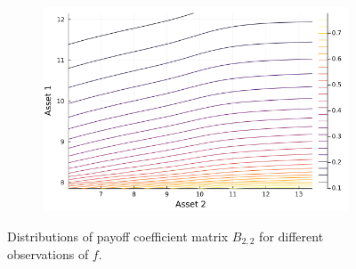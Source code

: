 \documentclass{article}
\begin{document}
\begin{figure}
\begin{subfigure}{0.4\textwidth}
    \end{subfigure}
    \begin{subfigure}{0.4\textwidth}
        \includegraphics[width=\textwidth]{../plots/params/more-corr-meanvarshift/b22.png}
    \end{subfigure}
    \caption{Distributions of payoff coefficient matrix $B_{2,2}$ for different observations of $f$.}
    \label{fig:b22}
\end{figure}
\end{document}
